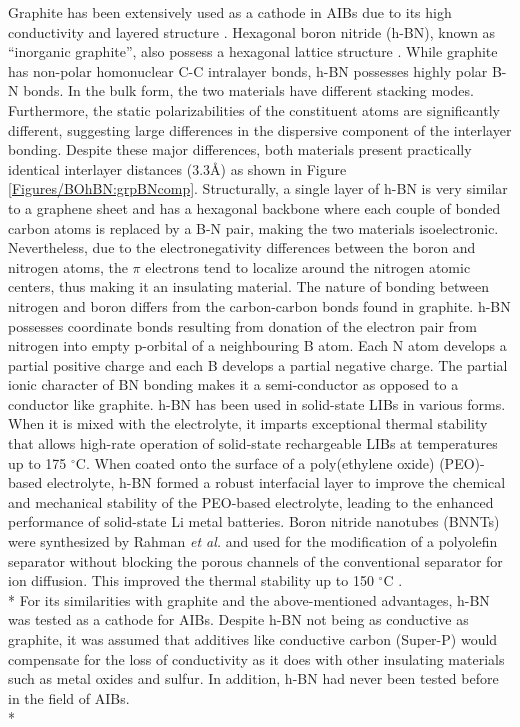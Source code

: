 Graphite has been extensively used as a cathode in AIBs due to its high conductivity and layered structure \cite{lin_ultrafast_2015,rani_fluorinated_2013,wang_advanced_2017,kravchyk_efficient_2017,li_novel_2018}. Hexagonal boron nitride (h-BN), known as \enquote{inorganic graphite}, also possess a hexagonal lattice structure \cite{hod_graphite_2012}. While graphite has non-polar homonuclear C-C intralayer bonds, h-BN possesses highly polar B-N bonds. In the bulk form, the two materials have different stacking modes. Furthermore, the static polarizabilities of the constituent atoms are significantly different, suggesting large differences in the dispersive component of the interlayer bonding\cite{song_large_2010, zeng_white_2010}. Despite these major differences, both materials present practically identical interlayer distances (3.3\AA) as shown in  Figure \ref{Figures/BOhBN:grpBNcomp}. Structurally, a single layer of h-BN is very similar to a graphene sheet and has a hexagonal backbone where each couple of bonded carbon atoms is replaced by a B-N pair, making the two materials isoelectronic. Nevertheless, due to the electronegativity differences between the boron and nitrogen atoms, the $\pi$ electrons tend to localize around the nitrogen atomic centers, thus making it an insulating material. The nature of bonding between nitrogen and boron differs from the carbon-carbon bonds found in graphite. h-BN possesses coordinate bonds resulting from donation of the electron pair from nitrogen into empty p-orbital of a neighbouring B atom. Each N atom develops a partial positive charge and each B develops a partial negative charge. The partial ionic character of BN bonding makes it a semi-conductor as opposed to a conductor like graphite. h-BN has been used in solid-state LIBs in various forms. When it is mixed with the electrolyte, it imparts exceptional thermal stability that allows high-rate operation of solid-state rechargeable LIBs at temperatures up to 175 $^{\circ}$C\cite{hyun_high-modulus_2019}. When coated onto the surface of a poly(ethylene oxide) (PEO)-based electrolyte, h-BN formed a robust interfacial layer to improve the chemical and mechanical stability of the PEO-based electrolyte, leading to the enhanced performance of solid-state Li metal batteries\cite{shen_chemically_2019}. Boron nitride nanotubes (BNNTs) were synthesized by Rahman \textit{et al.} and used for the modification of a polyolefin separator without blocking the porous channels of the conventional separator for  ion diffusion. This improved the thermal stability up to 150 $^{\circ}$C \cite{rahman_high_2019}.\\*
For its similarities with graphite and the above-mentioned advantages, h-BN was tested as a cathode for AIBs. Despite h-BN not being as conductive as graphite, it was assumed that additives like conductive carbon (Super-P) would compensate for the loss of conductivity as it does with other insulating materials such as metal oxides and sulfur. In addition, h-BN had never been tested before in the field of AIBs.\\* 

